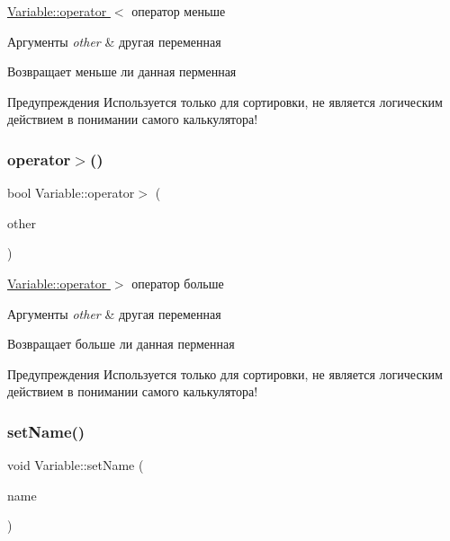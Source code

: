 \hyperlink{class_variable_ac0aa608ee2a38525351a6a5d902a466f}{Variable\+::operator $<$} оператор меньше 


\begin{DoxyParams}{Аргументы}
{\em other} & другая переменная \\
\hline
\end{DoxyParams}
\begin{DoxyReturn}{Возвращает}
меньше ли данная перменная
\end{DoxyReturn}
\begin{DoxyWarning}{Предупреждения}
Используется только для сортировки, не является логическим действием в понимании самого калькулятора! 
\end{DoxyWarning}
\mbox{\label{class_variable_a94991de2c5fd8fd5a66b74f726f0c645}} 
\subsubsection{\texorpdfstring{operator$>$()}{operator>()}}
{\footnotesize\ttfamily bool Variable\+::operator$>$ (\begin{DoxyParamCaption}\item[{const \hyperlink{class_variable}{Variable} \&}]{other }\end{DoxyParamCaption})}



\hyperlink{class_variable_a94991de2c5fd8fd5a66b74f726f0c645}{Variable\+::operator $>$} оператор больше 


\begin{DoxyParams}{Аргументы}
{\em other} & другая переменная \\
\hline
\end{DoxyParams}
\begin{DoxyReturn}{Возвращает}
больше ли данная перменная
\end{DoxyReturn}
\begin{DoxyWarning}{Предупреждения}
Используется только для сортировки, не является логическим действием в понимании самого калькулятора! 
\end{DoxyWarning}
\mbox{\label{class_variable_ab58f8291d67e633fd1ad76148fad9e1a}} 
\subsubsection{\texorpdfstring{set\+Name()}{setName()}}
{\footnotesize\ttfamily void Variable\+::set\+Name (\begin{DoxyParamCaption}\item[{const Q\+String \&}]{name }\end{DoxyParamCaption})}



